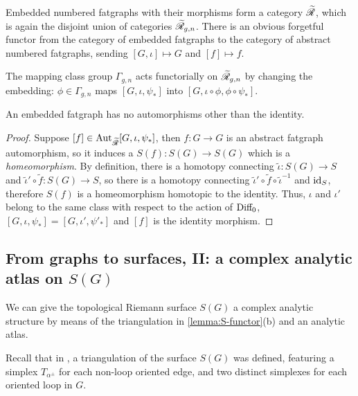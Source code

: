 Embedded numbered fatgraphs with their morphisms form a category
$\mathscr{\widetilde R}$, which is again the disjoint union of categories $\mathscr{\widetilde R}_{g,n}$.
There is an obvious forgetful functor from the category of embedded
fatgraphs to the category of abstract numbered fatgraphs,
sending $[G, \iota] \mapsto G$ and $[f] \mapsto f$.

The mapping class group $\Gamma_{g,n}$ acts functorially on
$\mathscr{\widetilde R}_{g,n}$ by changing the embedding: $\phi \in \Gamma_{g,n}$ maps
$[G, \iota, \psi_*]$ into $[G, \iota \circ \phi, \phi \circ \psi_*]$.

\begin{lemma}
  \label{lemma:erg-no-aut}
  An embedded fatgraph has no automorphisms other than the identity.
\end{lemma}
\begin{proof}
  Suppose $[f] \in \operatorname{Aut}_{\mathscr{\widetilde R}}[G, \iota, \psi_*]$, then $f:G\to G$ is an abstract
  fatgraph automorphism, so it induces a $S(f): S(G) \to S(G)$
  which is a \emph{homeomorphism}.  By definition, there is a homotopy
  connecting ${\tilde \iota}: S(G) \to S$ and ${\tilde \iota'} \circ {\tilde f}:
  S(G)\to S$, so there is a homotopy connecting ${\tilde \iota'} \circ {\tilde f}
  \circ {\tilde \iota}^{-1}$ and $\operatorname{id}_S$, therefore $S(f)$ is a
  homeomorphism homotopic to the identity.  Thus, $\iota$ and $\iota'$ belong
  to the same class with respect to the action of $\textrm{Diff}_0$, $[G, \iota,
  \psi_*] = [G, \iota', \psi'_*]$ and $[f]$ is the identity morphism.
\end{proof}


\subsection{From graphs to surfaces, II: a complex analytic atlas on $S(G)$}
\label{sec:atlas}

We can give the topological Riemann surface $S(G)$ a complex analytic
structure by means of the triangulation in \ref{lemma:S-functor}(b)
and an analytic atlas.

Recall that in , a triangulation of the surface
$S(G)$ was defined, featuring a simplex $T_{\alpha^\pm}$ for each
non-loop oriented edge, and two distinct simplexes for each oriented
loop in $G$.


